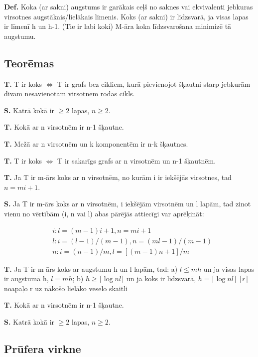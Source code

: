 \documentclass{article}
\begin{document}
\textbf{Def.}  Koka (ar sakni) augstums ir garākais ceļš no saknes vai ekvivalenti jebkuras virsotnes augstākais/lielākais līmenis.  Koks (ar sakni) ir līdzsvarā, ja visas lapas ir līmenī h un h-1. (Tie ir labi koki) M-āra koka līdzsvarošana minimizē tā augstumu.

\subsection{Teorēmas}

\textbf{T. } T ir koks $\Leftrightarrow$ T ir grafs bez cikliem, kurā pievienojot šķautni starp jebkurām divām nesavienotām virsotnēm rodas cikls.

\textbf{S. } Katrā kokā ir $\ge 2$ lapas, $n \ge 2$.

\textbf{T. } Kokā ar n virsotnēm ir n-1 šķautne.

\textbf{T. } Mežā ar n virsotnēm un k komponentēm ir n-k šķautnes.

\textbf{T. } T ir koks $⇔$ T ir sakarīgs grafs ar n virsotnēm un n-1 šķautnēm.

\textbf{T. } Ja T ir m-ārs koks ar n virsotnēm, no kurām i ir iekšējās virsotnes, tad $n = mi + 1$.

\textbf{S. } Ja T ir m-ārs koks ar n virsotnēm, i iekšējām virsotnēm un l lapām, tad zinot vienu no vērtībām (i, n vai l) abas pārējās attiecīgi var aprēķināt:

\begin{align}
		&i : l = (m − 1)i + 1, n = mi + 1\\
		&l : i = (l − 1)/(m − 1), n = (ml − 1)/(m − 1)\\
		&n : i = (n − 1)/m, l = [(m − 1)n + 1]/m
\end{align}

\textbf{T. } Ja T ir m-ārs koks ar augstumu h un l lapām, tad: a) $l \le mh$ un ja visas lapas ir augstumā h, $l = mh$; b) $h \ge \lceil \log{n}l \rceil$ un ja koks ir līdzsvarā, $h =\lceil \log{n}l \rceil$
$\lceil r \rceil$ noapaļo r uz nākošo lielāko veselo skaitli

\textbf{T. } Kokā ar n virsotnēm ir n-1 šķautne.

\textbf{S. } Katrā kokā ir $\ge 2$ lapas, $n \ge 2$.

\subsection{Prūfera virkne}
\end{document}

